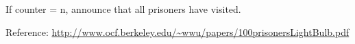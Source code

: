\documentclass[11pt]{article}
\def\pp{\par\noindent}
\begin{document}
   \hspace{1.0 cm}If counter = n, announce that all prisoners have visited.

\bigskip
Reference: \url{http://www.ocf.berkeley.edu/~wwu/papers/100prisonersLightBulb.pdf}




















\end{document}
